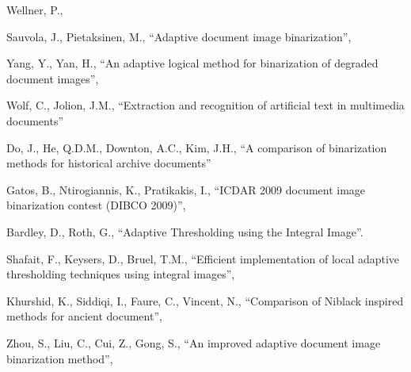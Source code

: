 \documentclass[uplatex, twocolumn,10pt]{jsarticle}
\begin{document}
\begin{thebibliography}{99}
    Wellner, P.,
    
    Sauvola, J., Pietaksinen, M.,
    \newblock “Adaptive document image binarization”,
    
    Yang, Y., Yan, H., 
    \newblock “An adaptive logical method for binarization of degraded document images”,
    
    Wolf, C., Jolion, J.M.,
    \newblock “Extraction and recognition of artificial text in multimedia documents”
    
    Do, J., He, Q.D.M., Downton, A.C., Kim, J.H.,
    \newblock “A comparison of binarization methods for historical archive documents”
    
    Gatos, B., Ntirogiannis, K., Pratikakis, I.,
    \newblock “ICDAR 2009 document image binarization contest (DIBCO 2009)”,
    
    Bardley, D., Roth, G.,
    \newblock “Adaptive Thresholding using the Integral Image”.
    
    Shafait, F., Keysers, D., Bruel, T.M.,
    \newblock “Efficient implementation of local adaptive thresholding techniques using integral images”,
    
    Khurshid, K., Siddiqi, I., Faure, C., Vincent, N.,
    \newblock “Comparison of Niblack inspired methods for ancient document”,
    
    Zhou, S., Liu, C., Cui, Z., Gong, S., 
    \newblock “An improved adaptive document image binarization method”,
    

\end{thebibliography}
\end{document}
